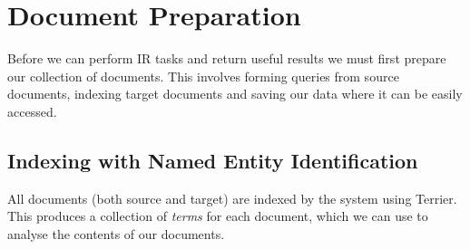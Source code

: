 \documentclass{l4proj}
\begin{document}
\section{Document Preparation}
Before we can perform IR tasks and return useful results we must first prepare our collection of documents. This involves forming queries from source documents, indexing target documents and saving our data where it can be easily accessed.

\subsection{Indexing with Named Entity Identification} \label{nertok}
All documents (both source and target) are indexed by the system using Terrier. This produces a collection of \textit{terms} for each document, which we can use to analyse the contents of our documents.
\end{document}
